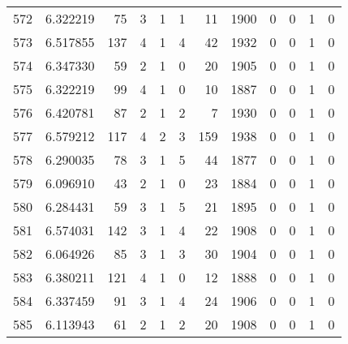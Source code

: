 \begin{tabular}{lrrrrrrrrrrr}
572 &  6.322219 &   75 &      3 &        1 &      1 &              11 &  1900 &               0 &               0 &               1 &               0 \\
573 &  6.517855 &  137 &      4 &        1 &      4 &              42 &  1932 &               0 &               0 &               1 &               0 \\
574 &  6.347330 &   59 &      2 &        1 &      0 &              20 &  1905 &               0 &               0 &               1 &               0 \\
575 &  6.322219 &   99 &      4 &        1 &      0 &              10 &  1887 &               0 &               0 &               1 &               0 \\
576 &  6.420781 &   87 &      2 &        1 &      2 &               7 &  1930 &               0 &               0 &               1 &               0 \\
577 &  6.579212 &  117 &      4 &        2 &      3 &             159 &  1938 &               0 &               0 &               1 &               0 \\
578 &  6.290035 &   78 &      3 &        1 &      5 &              44 &  1877 &               0 &               0 &               1 &               0 \\
579 &  6.096910 &   43 &      2 &        1 &      0 &              23 &  1884 &               0 &               0 &               1 &               0 \\
580 &  6.284431 &   59 &      3 &        1 &      5 &              21 &  1895 &               0 &               0 &               1 &               0 \\
581 &  6.574031 &  142 &      3 &        1 &      4 &              22 &  1908 &               0 &               0 &               1 &               0 \\
582 &  6.064926 &   85 &      3 &        1 &      3 &              30 &  1904 &               0 &               0 &               1 &               0 \\
583 &  6.380211 &  121 &      4 &        1 &      0 &              12 &  1888 &               0 &               0 &               1 &               0 \\
584 &  6.337459 &   91 &      3 &        1 &      4 &              24 &  1906 &               0 &               0 &               1 &               0 \\
585 &  6.113943 &   61 &      2 &        1 &      2 &              20 &  1908 &               0 &               0 &               1 &               0 \\

\end{tabular}
